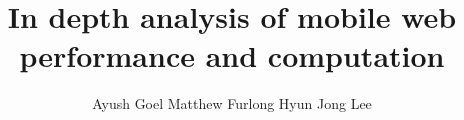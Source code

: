 \documentclass{ns-article-compact}
\begin{document}
\newcommand{\paraspace}{\vspace{0.02in}}
\newcommand{\parab}[1]{\paraspace\noindent{\bf #1} }
\newcommand{\parae}[1]{\paraspace\noindent{\em #1} }
\newcommand{\parabe}[1]{\paraspace\noindent{\bf \em #1} }

\newcommand{\system}{{\sc Pando}\xspace}
\newcommand{\pman}{Placement Manager\xspace}

\def\papertitle{ In depth analysis of mobile
 web performance and computation}

\title{\papertitle}

\author{Ayush Goel   Matthew Furlong    Hyun Jong Lee} %


\maketitle

\thispagestyle{empty}






\label{lastpage}

\clearpage



\clearpage
\appendix
\end{document}

